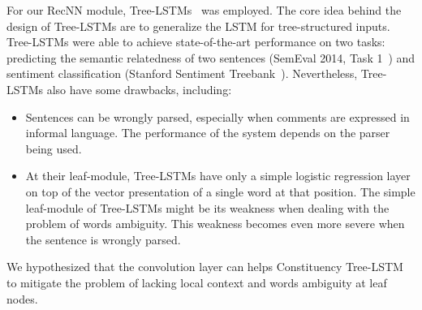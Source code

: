 For our RecNN module, Tree-LSTMs~\cite{treeLSTM} was employed.
The core idea behind the design of Tree-LSTMs are to generalize the LSTM for tree-structured inputs.
Tree-LSTMs were able to achieve state-of-the-art performance on two tasks: predicting the semantic relatedness of two sentences (SemEval 2014, Task 1~\cite{SemeEvalTask1}) and sentiment classification (Stanford Sentiment Treebank~\cite{socher2013recursive}).
Nevertheless, Tree-LSTMs also have some drawbacks, including:
\begin{itemize}
	\item Sentences can be wrongly parsed, especially when comments are expressed in informal language.
	The performance of the system depends on the parser being used.
	\item At their leaf-module, Tree-LSTMs have only a simple logistic regression layer on top of the vector presentation of a single word at that position.
	The simple leaf-module of Tree-LSTMs might be its weakness when dealing with the problem of words ambiguity.
	This weakness becomes even more severe when the sentence is wrongly parsed.
\end{itemize}
We hypothesized that the convolution layer can helps Constituency Tree-LSTM to mitigate the problem of lacking local context and words ambiguity at leaf nodes.
